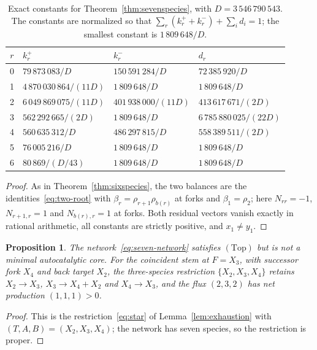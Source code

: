 \documentclass[11pt,reqno]{amsart}
\theoremstyle{plain}
\newtheorem{proposition}[theorem]{Proposition}
\theoremstyle{definition}
\theoremstyle{remark}
\numberwithin{equation}{section}
\newcommand{\Top}{\mathrm{(Top)}}
\begin{document}
\begin{table}[ht]
\centering
\caption{Exact constants for Theorem~\ref{thm:sevenspecies}, with $D=3\,546\,790\,543$.  The constants are normalized so that $\sum_r(k_r^++k_r^-)+\sum_id_i=1$; the smallest constant is $1\,809\,648/D$.}
\label{tab:seven}
\small
\begin{tabular}{@{}c l l l@{}}
\toprule
$r$ & $k_r^+$ & $k_r^-$ & $d_r$\\
\midrule
0 & $79\,873\,083/D$ & $150\,591\,284/D$ & $72\,385\,920/D$\\
1 & $4\,870\,030\,864/(11D)$ & $1\,809\,648/D$ & $1\,809\,648/D$\\
2 & $6\,049\,869\,075/(11D)$ & $401\,938\,000/(11D)$ & $413\,617\,671/(2D)$\\
3 & $562\,292\,665/(2D)$ & $1\,809\,648/D$ & $6\,785\,880\,025/(22D)$\\
4 & $560\,635\,312/D$ & $486\,297\,815/D$ & $558\,389\,511/(2D)$\\
5 & $76\,005\,216/D$ & $1\,809\,648/D$ & $1\,809\,648/D$\\
6 & $80\,869/(D/43)$ & $1\,809\,648/D$ & $1\,809\,648/D$\\
\bottomrule
\end{tabular}
\end{table}

\begin{proof}
As in Theorem~\ref{thm:sixspecies}, the two balances are the identities~\eqref{eq:two-root} with $\beta_r=\rho_{r+1}\rho_{b(r)}$ at forks and $\beta_1=\rho_2$; here $N_{rr}=-1$, $N_{r+1,r}=1$ and $N_{b(r),r}=1$ at forks.  Both residual vectors vanish exactly in rational arithmetic, all constants are strictly positive, and $x_1\ne y_1$.
\end{proof}

\begin{proposition}\label{prop:seven-nonminimal}
The network~\eqref{eq:seven-network} satisfies $\Top$ but is not a minimal autocatalytic core.  For the coincident stem at $F=X_3$, with successor fork $X_4$ and back target $X_2$, the three-species restriction $\{X_2,X_3,X_4\}$ retains $X_2\to X_3$, $X_3\to X_4+X_2$ and $X_4\to X_3$, and the flux $(2,3,2)$ has net production $(1,1,1)>0$.
\end{proposition}

\begin{proof}
This is the restriction~\eqref{eq:star} of Lemma~\ref{lem:exhaustion} with $(T,A,B)=(X_2,X_3,X_4)$; the network has seven species, so the restriction is proper.
\end{proof}
\end{document}
